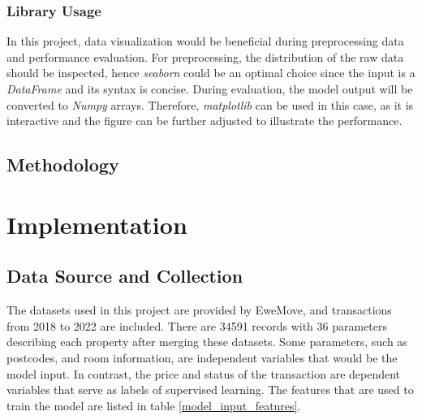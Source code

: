 \documentclass[12pt,twoside]{report}
\begin{document}
\subsection{Library Usage}
In this project, data visualization would be beneficial during preprocessing data and performance evaluation. For preprocessing, the distribution of the raw data should be inspected, hence \textit{seaborn} could be an optimal choice since the input is a \textit{DataFrame} and its syntax is concise. During evaluation, the model output will be converted to \textit{Numpy} arrays. Therefore, \textit{matplotlib} can be used in this case, as it is interactive and the figure can be further adjusted to illustrate the performance. 

\section{Methodology}

\chapter{Implementation}
\section{Data Source and Collection}
The datasets used in this project are provided by EweMove, and transactions from 2018 to 2022 are included. There are 34591 records with 36 parameters describing each property after merging these datasets. Some parameters, such as postcodes, and room information, are independent variables that would be the model input. In contrast, the price and status of the transaction are dependent variables that serve as labels of supervised learning. The features that are used to train the model are listed in table \ref{model_input_features}. 
\end{document}
